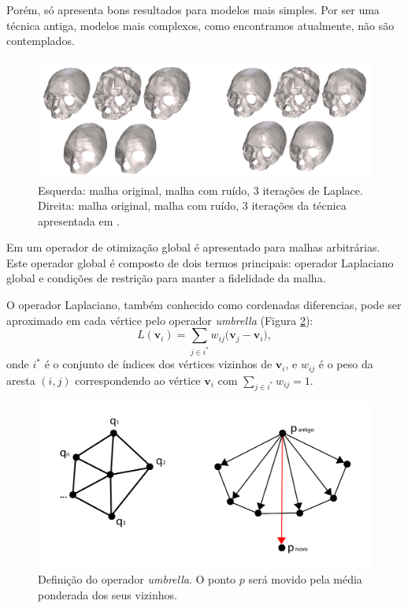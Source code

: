 Porém, só apresenta bons resultados para modelos mais simples. Por ser uma técnica antiga, modelos mais complexos, como encontramos atualmente, não são contemplados.

\begin{figure}[!h]
\captionsetup{width=\linewidth}
\centering
\includegraphics[width=\linewidth]{figuras/volmmerExample.png}
\caption{Esquerda: malha original, malha com ruído, 3 iterações de Laplace. Direita: malha original, malha com ruído, 3 iterações da técnica apresentada em \cite{vollmer1999improved}.}
\label{fig:vollmerExample}
\end{figure}

Em \cite{liu2007non} um operador de otimização global é apresentado para malhas arbitrárias. Este operador global é composto de dois termos principais: operador Laplaciano global e condições de restrição para manter a fidelidade da malha. 

O operador Laplaciano, também conhecido como cordenadas diferencias, pode ser aproximado em cada vértice pelo operador \textit{umbrella} (Figura \ref{fig:umbrella}):
\begin{equation}
    L(\mathbf{v}_i) = \sum_{j\in i^*}{w_{ij}(\mathbf{v}_j - \mathbf{v}_i}),
\end{equation}
onde $i^*$ é o conjunto de índices dos vértices vizinhos de $\mathbf{v}_i$, e $w_{ij}$ é o peso da aresta $(i,j)$ correspondendo ao vértice $\mathbf{v}_i$ com $\sum_{j\in i^*}{w_{ij} = 1}.$

\begin{figure}[!h]
\captionsetup{width=\linewidth}
\centering
\includegraphics[scale=0.30]{figuras/umbrella_operator.png}
\caption{Definição do operador \textit{umbrella}. O ponto $p$ será movido pela média ponderada dos seus vizinhos.}
\label{fig:umbrella}
\end{figure}

